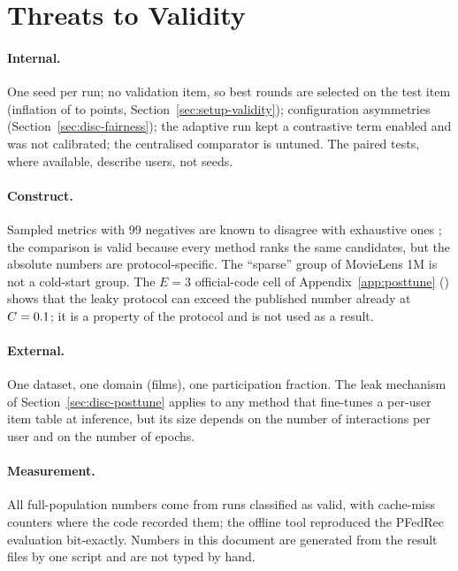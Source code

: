 \section{Threats to Validity}
\label{sec:disc-threats}

\paragraph{Internal.} One seed per run; no validation item, so best rounds are selected on the
test item (inflation of \InflationBaseline{} to \InflationPfedrec{} points,
Section~\ref{sec:setup-validity}); configuration asymmetries (Section~\ref{sec:disc-fairness});
the adaptive run kept a contrastive term enabled and was not calibrated; the centralised
comparator is untuned. The paired tests, where available, describe users, not seeds.

\paragraph{Construct.} Sampled metrics with 99 negatives are known to disagree with exhaustive
ones \cite{krichene2020sampled}; the comparison is valid because every method ranks the same
candidates, but the absolute numbers are protocol-specific. The ``sparse'' group of MovieLens 1M
is not a cold-start group. The $E=3$ official-code cell of Appendix~\ref{app:posttune}
(\NdcgEThreeLeaky) shows that the leaky protocol can exceed the published number already at
$C=0.1$; it is a property of the protocol and is not used as a result.

\paragraph{External.} One dataset, one domain (films), one participation fraction. The leak
mechanism of Section~\ref{sec:disc-posttune} applies to any method that fine-tunes a per-user
item table at inference, but its size depends on the number of interactions per user and on
the number of epochs.

\paragraph{Measurement.} All full-population numbers come from runs classified as valid, with
cache-miss counters where the code recorded them; the offline tool reproduced the PFedRec
evaluation bit-exactly. Numbers in this document are generated from the result files by one
script and are not typed by hand.
